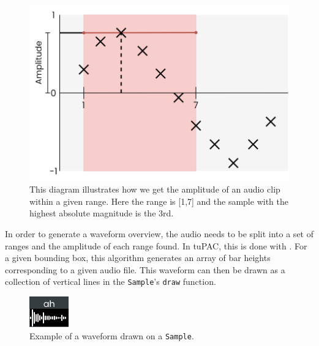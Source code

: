 \documentclass[12pt,a4paper,twoside,openright]{report}
\newcommand{\sample}{\texttt{Sample}}
\begin{document}
\begin{figure}[h]
    \centering
    \includegraphics[scale=0.3]{images/amplitude_example.png}
    \caption{This diagram illustrates how we get the amplitude of an audio clip within a given range. Here the range is [1,7] and the sample with the highest absolute magnitude is the 3rd.}
    \label{fig:amplitude}
\end{figure}

In order to generate a waveform overview, the audio needs to be split into a set of ranges and the amplitude of each range found. In tuPAC, this is done with . For a given bounding box, this algorithm generates an array of bar heights corresponding to a given audio file. This waveform can then be drawn as a collection of vertical lines in the \sample's \verb|draw| function.

\begin{figure}[h]
    \centering
    \includegraphics[scale=1.5]{images/sample.png}
    \caption{Example of a waveform drawn on a \sample.}
    \label{fig:my_label}
\end{figure}
\end{document}
